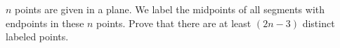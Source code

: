 $n$ points are given in a plane. We label the midpoints of all segments with endpoints in these $n$ points. Prove that there are at least $(2n - 3)$ distinct labeled points.
